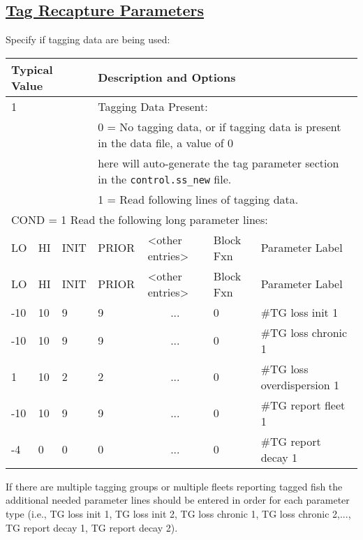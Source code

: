 \hypertarget{tagrecapture}{}
\subsection[Tag Recapture Parameters]{\protect\hyperlink{tagrecapture}{Tag Recapture Parameters}}
Specify if tagging data are being used:


\begin{longtable}{p{1cm} p{1cm} p{1cm} p{1.5cm} p{2.9cm} p{1.25cm} p{4.25cm}}
	\hline
	\multicolumn{3}{l}{Typical Value} & \multicolumn{4}{l}{Description and Options} \Tstrut\Bstrut\\
	\hline
	\multicolumn{3}{l}{1} & \multicolumn{4}{l}{Tagging Data Present:} \Tstrut\\
	\multicolumn{3}{l}{}  & \multicolumn{4}{l}{0 = No tagging data, or if tagging data is present in the data file, a value of 0} \\
	\multicolumn{3}{l}{}  & \multicolumn{4}{l}{here will auto-generate the tag parameter section in the \texttt{control.ss\_new} file.} \\
	\multicolumn{3}{l}{}  & \multicolumn{4}{l}{1 = Read following lines of tagging data.} \Bstrut\\


	\multicolumn{7}{l}{COND = 1 Read the following long parameter lines:} \Tstrut\\
	\hline
	LO \Tstrut & HI & INIT & PRIOR &  <other entries> & Block Fxn & Parameter Label \Bstrut\\
	\hline
	\endfirsthead

	\hline
	LO \Tstrut & HI & INIT & PRIOR & <other entries> & Block Fxn & Parameter Label \Bstrut\\
	\hline
	\endhead

	\hline
	\endfoot
	\endlastfoot

	-10 & 10 & 9 & 9 & \multicolumn{1}{c}{...} & 0 & \#TG loss init 1 \Tstrut\\
	-10 & 10 & 9 & 9 & \multicolumn{1}{c}{...} & 0 & \#TG loss chronic 1 \\
	  1 & 10 & 2 & 2 & \multicolumn{1}{c}{...} & 0 & \#TG loss overdispersion 1 \\
	-10 & 10 & 9 & 9 & \multicolumn{1}{c}{...} & 0 & \#TG report fleet 1 \\
	 -4 &  0 & 0 & 0 & \multicolumn{1}{c}{...} & 0 & \#TG report decay 1 \Bstrut\\
	 \hline
\end{longtable}

If there are multiple tagging groups or multiple fleets reporting tagged fish the additional needed parameter lines should be entered in order for each parameter type (i.e., TG loss init 1, TG loss init 2, TG loss chronic 1, TG loss chronic 2,..., TG report decay 1, TG report decay 2). 


